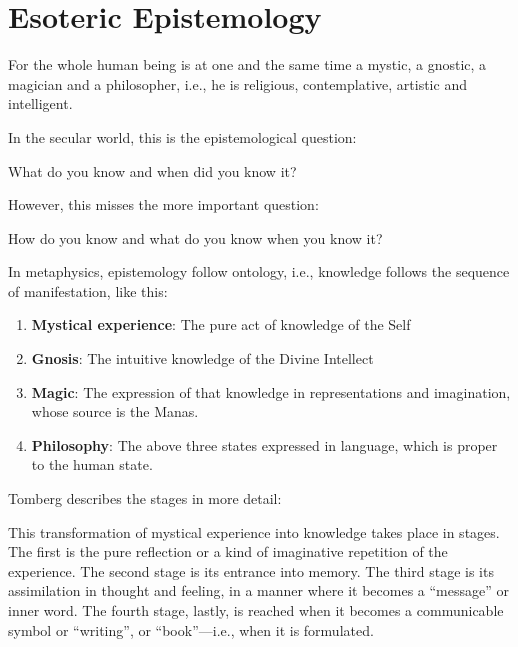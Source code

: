 \section{Esoteric Epistemology}

\begin{quotex}
For the whole human being is at one and the same time a mystic, a gnostic, a magician and a philosopher, i.e., he is religious, contemplative, artistic and intelligent. 

\end{quotex}
In the secular world, this is the epistemological question:

\begin{quotex}
What do you know and when did you know it? 

\end{quotex}
However, this misses the more important question:

\begin{quotex}
How do you know and what do you know when you know it?

\end{quotex}
In metaphysics, epistemology follow ontology, i.e., knowledge follows the sequence of manifestation, like this:

\begin{enumerate}
\item \textbf{Mystical experience}: The pure act of knowledge of the Self 
\item \textbf{Gnosis}: The intuitive knowledge of the Divine Intellect 
\item \textbf{Magic}: The expression of that knowledge in representations and imagination, whose source is the Manas. 
\item \textbf{Philosophy}: The above three states expressed in language, which is proper to the human state. 
\end{enumerate}
Tomberg describes the stages in more detail:

\begin{quotex}
This transformation of mystical experience into knowledge takes place in stages. The first is the pure reflection or a kind of imaginative repetition of the experience. The second stage is its entrance into memory. The third stage is its assimilation in thought and feeling, in a manner where it becomes a “message” or inner word. The fourth stage, lastly, is reached when it becomes a communicable symbol or “writing”, or “book”—i.e., when it is formulated. 

\end{quotex}
